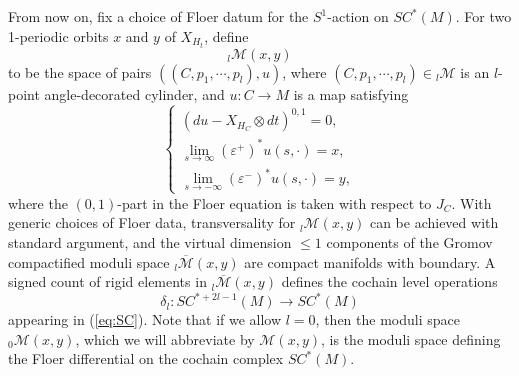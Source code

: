 \documentclass[a4paper]{article}
\numberwithin{equation}{section}
\begin{document}
From now on, fix a choice of Floer datum for the $S^1$-action on $\mathit{SC}^\ast(M)$. For two 1-periodic orbits $x$ and $y$ of $X_{H_t}$, define
\begin{equation}
{}_l\mathcal{M}(x,y)
\end{equation}
to be the space of pairs $\left((C,p_1,\cdots,p_l),u\right)$, where $(C,p_1,\cdots,p_l)\in{}_l\mathcal{M}$ is an $l$-point angle-decorated cylinder, and $u:C\rightarrow M$ is a map satisfying
\begin{equation}\label{eq:F-eq}
\left\{\begin{array}{l}(du-X_{H_C}\otimes dt)^{0,1}=0, \\ \lim_{s\rightarrow\infty}(\varepsilon^+)^\ast u(s,\cdot)=x, \\ \lim_{s\rightarrow-\infty}(\varepsilon^-)^\ast u(s,\cdot)=y,\end{array}\right.
\end{equation}
where the $(0,1)$-part in the Floer equation is taken with respect to $J_C$. With generic choices of Floer data, transversality for ${}_l\mathcal{M}(x,y)$ can be achieved with standard argument, and the virtual dimension $\leq1$ components of the Gromov compactified moduli space ${}_l\overline{\mathcal{M}}(x,y)$ are compact manifolds with boundary. A signed count of rigid elements in ${}_l\overline{\mathcal{M}}(x,y)$ defines the cochain level operations
\begin{equation}
\delta_l:\mathit{SC}^{\ast+2l-1}(M)\rightarrow\mathit{SC}^\ast(M)
\end{equation}
appearing in (\ref{eq:SC}). Note that if we allow $l=0$, then the moduli space ${}_0\mathcal{M}(x,y)$, which we will abbreviate by $\mathcal{M}(x,y)$, is the moduli space defining the Floer differential on the cochain complex $\mathit{SC}^\ast(M)$.
\bigskip
\end{document}
